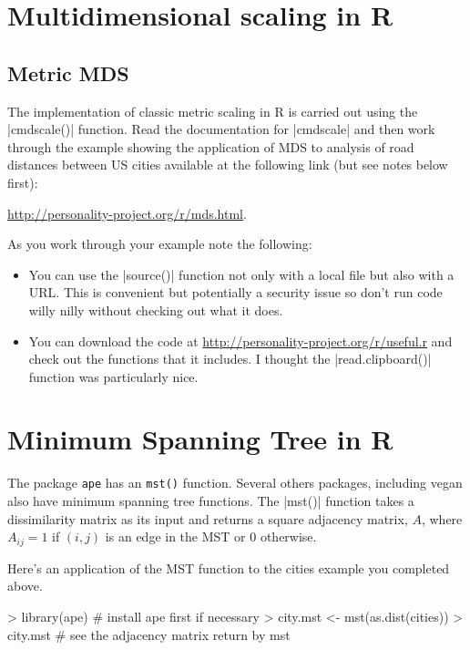 \documentclass[10pt,letterpaper]{article}
\begin{document}
\section*{Multidimensional scaling in R}

\subsection*{Metric MDS}

The implementation of classic metric scaling in R is carried out using the |cmdscale()| function. Read the documentation for |cmdscale| and then work through the example showing the application of MDS to analysis of road distances between US cities available at the following link (but see notes below first):

\href{http://personality-project.org/r/mds.html}{http://personality-project.org/r/mds.html}.

\medskip
As you work through your example note the following:

\begin{itemize}
\item You can use the |source()| function not only with a local file but also with a URL.  This is convenient but potentially a security issue so don't run code willy nilly without checking out what it does.

\item You can download the code at \href{http://personality-project.org/r/useful.r}{http://personality-project.org/r/useful.r} and check out the functions that it includes. I thought the |read.clipboard()| function was particularly nice.
\end{itemize}


\section*{Minimum Spanning Tree in R}

The package \texttt{ape} has an \texttt{mst()} function. Several others packages, including vegan also have minimum spanning tree functions. The |mst()| function takes a dissimilarity matrix as its input and returns a square adjacency matrix, $A$, where $A_{ij} = 1$ if $(i,j)$ is an edge in the MST or 0 otherwise.

Here's an application of the MST function to the cities example you completed above.

\begin{Code}
> library(ape) # install ape first if necessary
> city.mst <- mst(as.dist(cities))
> city.mst # see the adjacency matrix return by mst
\end{Code}
\end{document}
